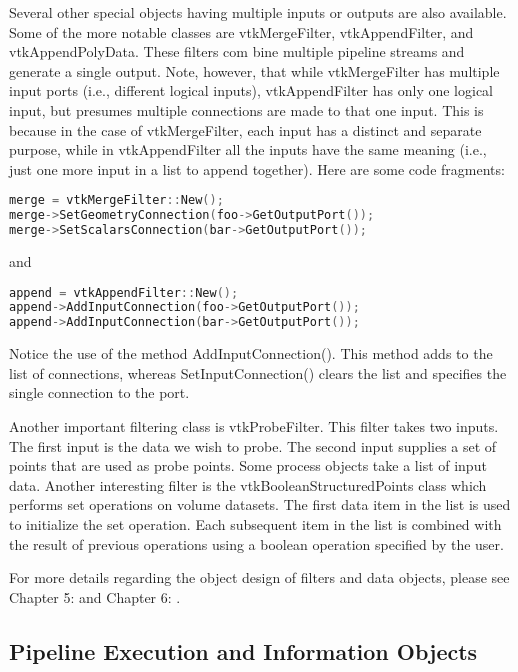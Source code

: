 Several other special objects having multiple inputs or outputs are also available. Some of the more notable classes are vtkMergeFilter, vtkAppendFilter, and vtkAppendPolyData. These filters com bine multiple pipeline streams and generate a single output. Note, however, that while vtkMergeFilter has multiple input ports (i.e., different logical inputs), vtkAppendFilter has only one logical input, but presumes multiple connections are made to that one input. This is because in the case of vtkMergeFilter, each input has a distinct and separate purpose, while in vtkAppendFilter all the inputs have the same meaning (i.e., just one more input in a list to append together). Here are some code fragments:

\begin{lstlisting}[language=C++, caption={}, numbers=none, frame=none]
merge = vtkMergeFilter::New();
merge->SetGeometryConnection(foo->GetOutputPort());
merge->SetScalarsConnection(bar->GetOutputPort());
\end{lstlisting}

and

\begin{lstlisting}[language=C++, caption={}, numbers=none, frame=none]
append = vtkAppendFilter::New();
append->AddInputConnection(foo->GetOutputPort());
append->AddInputConnection(bar->GetOutputPort());
\end{lstlisting}

Notice the use of the method AddInputConnection(). This method adds to the list of connections, whereas SetInputConnection() clears the list and specifies the single connection to the port.

Another important filtering class is vtkProbeFilter. This filter takes two inputs. The first input is the data we wish to probe. The second input supplies a set of points that are used as probe points. Some process objects take a list of input data. Another interesting filter is the vtkBooleanStructuredPoints class which performs set operations on volume datasets. The first data item in the list is used to initialize the set operation. Each subsequent item in the list is combined with the result of previous operations using a boolean operation specified by the user.

For more details regarding the object design of filters and data objects, please see Chapter 5:  and Chapter 6: .

\subsection{Pipeline Execution and Information Objects}
\label{subsec:pipeline_execution_and_information_objects}

